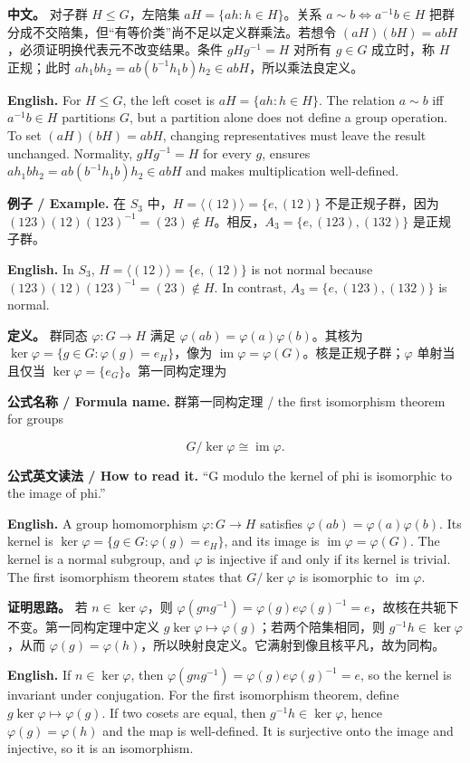 \documentclass[UTF8,11pt,a4paper]{ctexart}
\newcommand{\EN}[1]{\par\noindent\textbf{English.} #1\par}
\newcommand{\READ}[1]{\par\noindent\textbf{公式英文读法 / How to read it.} #1\par}
\newcommand{\FORMULA}[2]{\par\noindent\textbf{公式名称 / Formula name.} #1 / #2\par}
\newcommand{\EX}[2]{\par\noindent\textbf{例子 / Example.} #1\par\EN{#2}}
\newcommand{\APS}[2]{\par\noindent\textbf{中文。} #1\par\noindent\textbf{English.} #2\par\smallskip}
\begin{document}
\APS{对子群 $H\le G$，左陪集 $aH=\{ah:h\in H\}$。关系 $a\sim b\iff a^{-1}b\in H$ 把群分成不交陪集，但“有等价类”尚不足以定义群乘法。若想令 $(aH)(bH)=abH$，必须证明换代表元不改变结果。条件 $gHg^{-1}=H$ 对所有 $g\in G$ 成立时，称 $H$ 正规；此时 $ah_1bh_2=ab(b^{-1}h_1b)h_2\in abH$，所以乘法良定义。}{For $H\le G$, the left coset is $aH=\{ah:h\in H\}$. The relation $a\sim b$ iff $a^{-1}b\in H$ partitions $G$, but a partition alone does not define a group operation. To set $(aH)(bH)=abH$, changing representatives must leave the result unchanged. Normality, $gHg^{-1}=H$ for every $g$, ensures $ah_1bh_2=ab(b^{-1}h_1b)h_2\in abH$ and makes multiplication well-defined.}

\EX{在 $S_3$ 中，$H=\langle(12)\rangle=\{e,(12)\}$ 不是正规子群，因为 $(123)(12)(123)^{-1}=(23)\notin H$。相反，$A_3=\{e,(123),(132)\}$ 是正规子群。}{In $S_3$, $H=\langle(12)\rangle=\{e,(12)\}$ is not normal because $(123)(12)(123)^{-1}=(23)\notin H$. In contrast, $A_3=\{e,(123),(132)\}$ is normal.}

\noindent\textbf{定义。} 群同态 $\varphi:G\to H$ 满足 $\varphi(ab)=\varphi(a)\varphi(b)$。其核为 $\ker\varphi=\{g\in G:\varphi(g)=e_H\}$，像为 $\operatorname{im}\varphi=\varphi(G)$。核是正规子群；$\varphi$ 单射当且仅当 $\ker\varphi=\{e_G\}$。第一同构定理为
\FORMULA{群第一同构定理}{the first isomorphism theorem for groups}
\[
G/\ker\varphi\cong\operatorname{im}\varphi.
\]
\READ{“G modulo the kernel of phi is isomorphic to the image of phi.”}
\EN{A group homomorphism $\varphi:G\to H$ satisfies $\varphi(ab)=\varphi(a)\varphi(b)$. Its kernel is $\ker\varphi=\{g\in G:\varphi(g)=e_H\}$, and its image is $\operatorname{im}\varphi=\varphi(G)$. The kernel is a normal subgroup, and $\varphi$ is injective if and only if its kernel is trivial. The first isomorphism theorem states that $G/\ker\varphi$ is isomorphic to $\operatorname{im}\varphi$.}

\noindent\textbf{证明思路。} 若 $n\in\ker\varphi$，则 $\varphi(gng^{-1})=\varphi(g)e\varphi(g)^{-1}=e$，故核在共轭下不变。第一同构定理中定义 $g\ker\varphi\mapsto\varphi(g)$；若两个陪集相同，则 $g^{-1}h\in\ker\varphi$，从而 $\varphi(g)=\varphi(h)$，所以映射良定义。它满射到像且核平凡，故为同构。
\EN{If $n\in\ker\varphi$, then $\varphi(gng^{-1})=\varphi(g)e\varphi(g)^{-1}=e$, so the kernel is invariant under conjugation. For the first isomorphism theorem, define $g\ker\varphi\mapsto\varphi(g)$. If two cosets are equal, then $g^{-1}h\in\ker\varphi$, hence $\varphi(g)=\varphi(h)$ and the map is well-defined. It is surjective onto the image and injective, so it is an isomorphism.}
\end{document}

